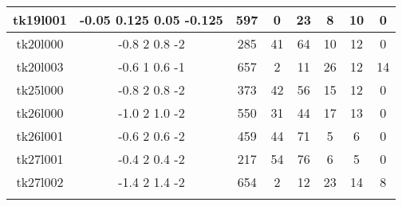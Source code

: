 \begin{tabular}{|c|c|c|c|c|c|c|c|}
\rowcolor[HTML]{ECF4FF} 
{\color[HTML]{333333} tk19l001} & {\color[HTML]{333333} -0.05 0.125 0.05 -0.125} & {\color[HTML]{333333} 597} & {\color[HTML]{333333} 0} & {\color[HTML]{333333} 23} & {\color[HTML]{333333} 8} & {\color[HTML]{333333} 10} & {\color[HTML]{333333} 0} \\ \hline
\rowcolor[HTML]{ECF4FF} 
{\color[HTML]{333333} tk20l000} & {\color[HTML]{333333} -0.8 2 0.8 -2} & {\color[HTML]{333333} 285} & {\color[HTML]{333333} 41} & {\color[HTML]{333333} 64} & {\color[HTML]{333333} 10} & {\color[HTML]{333333} 12} & {\color[HTML]{333333} 0} \\ \hline
\rowcolor[HTML]{ECF4FF} 
{\color[HTML]{333333} tk20l003} & {\color[HTML]{333333} -0.6 1 0.6 -1} & {\color[HTML]{333333} 657} & {\color[HTML]{333333} 2} & {\color[HTML]{333333} 11} & {\color[HTML]{333333} 26} & {\color[HTML]{333333} 12} & {\color[HTML]{333333} 14} \\ \hline
\rowcolor[HTML]{ECF4FF} 
{\color[HTML]{333333} tk25l000} & {\color[HTML]{333333} -0.8 2 0.8 -2} & {\color[HTML]{333333} 373} & {\color[HTML]{333333} 42} & {\color[HTML]{333333} 56} & {\color[HTML]{333333} 15} & {\color[HTML]{333333} 12} & {\color[HTML]{333333} 0} \\ \hline
\rowcolor[HTML]{ECF4FF} 
{\color[HTML]{333333} tk26l000} & {\color[HTML]{333333} -1.0 2 1.0 -2} & {\color[HTML]{333333} 550} & {\color[HTML]{333333} 31} & {\color[HTML]{333333} 44} & {\color[HTML]{333333} 17} & {\color[HTML]{333333} 13} & {\color[HTML]{333333} 0} \\ \hline
\rowcolor[HTML]{ECF4FF} 
{\color[HTML]{333333} tk26l001} & {\color[HTML]{333333} -0.6 2 0.6 -2} & {\color[HTML]{333333} 459} & {\color[HTML]{333333} 44} & {\color[HTML]{333333} 71} & {\color[HTML]{333333} 5} & {\color[HTML]{333333} 6} & {\color[HTML]{333333} 0} \\ \hline
\rowcolor[HTML]{ECF4FF} 
{\color[HTML]{333333} tk27l001} & {\color[HTML]{333333} -0.4 2 0.4 -2} & {\color[HTML]{333333} 217} & {\color[HTML]{333333} 54} & {\color[HTML]{333333} 76} & {\color[HTML]{333333} 6} & {\color[HTML]{333333} 5} & {\color[HTML]{333333} 0} \\ \hline
\rowcolor[HTML]{ECF4FF} 
{\color[HTML]{333333} tk27l002} & {\color[HTML]{333333} -1.4 2 1.4 -2} & {\color[HTML]{333333} 654} & {\color[HTML]{333333} 2} & {\color[HTML]{333333} 12} & {\color[HTML]{333333} 23} & {\color[HTML]{333333} 14} & {\color[HTML]{333333} 8} \\ \hline
\rowcolor[HTML]{ECF4FF} 
\end{tabular}
%
%